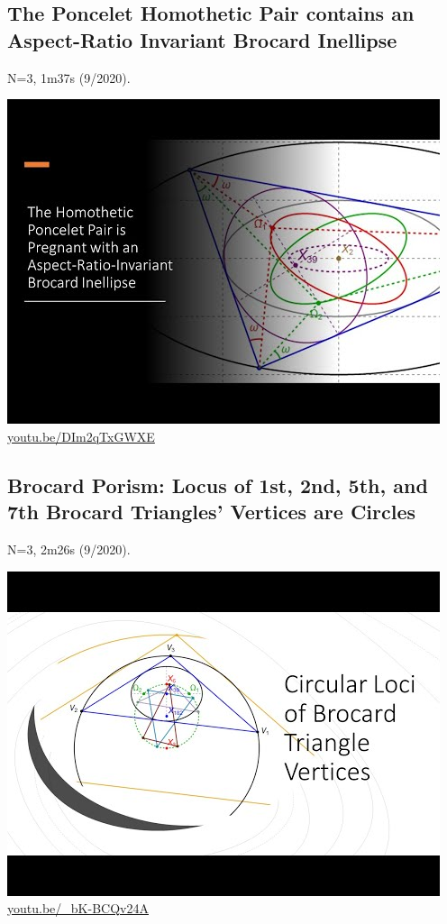 \documentclass[12pt]{amsart}
\begin{document}
\subsection{The Poncelet Homothetic Pair contains an Aspect-Ratio Invariant Brocard Inellipse}
\label{vid:DIm2qTxGWXE}
\noindent N=3, 1m37s (9/2020). 
\begin{center}\includegraphics[width=.5\textwidth]{pics/DIm2qTxGWXE.jpg} \\ 
\href{https://youtu.be/DIm2qTxGWXE}{\url{youtu.be/DIm2qTxGWXE}}\end{center}
% 

\subsection{Brocard Porism: Locus of 1st, 2nd, 5th, and 7th Brocard Triangles' Vertices are Circles}
\label{vid:_bK-BCQv24A}
\noindent N=3, 2m26s (9/2020). 
\begin{center}\includegraphics[width=.5\textwidth]{pics/_bK-BCQv24A.jpg} \\ 
\href{https://youtu.be/_bK-BCQv24A}{\url{youtu.be/\_bK-BCQv24A}}\end{center}
% 
\end{document}
